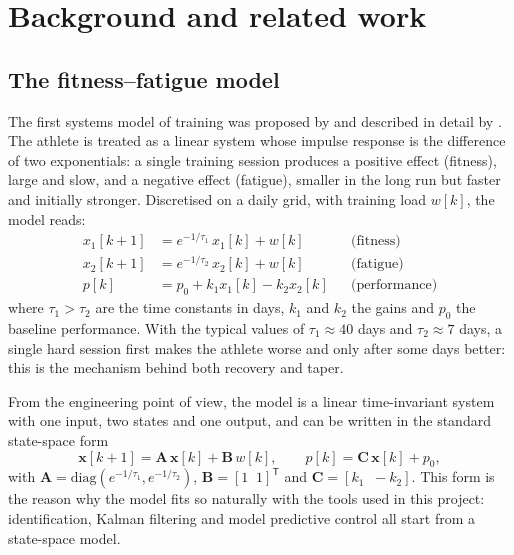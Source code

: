 \documentclass[11pt,a4paper]{article}
\begin{document}
\section{Background and related work}\label{sec:background}

\subsection{The fitness--fatigue model}
The first systems model of training was proposed by \citet{banister1975} and
described in detail by \citet{calvert1976}. The athlete is treated as a linear
system whose impulse response is the difference of two exponentials: a single
training session produces a positive effect (fitness), large and slow, and a
negative effect (fatigue), smaller in the long run but faster and initially
stronger. Discretised on a daily grid, with training load $w[k]$, the model
reads:
\begin{align}
x_1[k+1] &= e^{-1/\tau_1}\, x_1[k] + w[k] && \text{(fitness)}\label{eq:x1}\\
x_2[k+1] &= e^{-1/\tau_2}\, x_2[k] + w[k] && \text{(fatigue)}\label{eq:x2}\\
p[k]     &= p_0 + k_1 x_1[k] - k_2 x_2[k]  && \text{(performance)}\label{eq:p}
\end{align}
where $\tau_1 > \tau_2$ are the time constants in days, $k_1$ and $k_2$ the
gains and $p_0$ the baseline performance. With the typical values of
$\tau_1 \approx 40$ days and $\tau_2 \approx 7$ days, a single hard session
first makes the athlete worse and only after some days better: this is the
mechanism behind both recovery and taper.

From the engineering point of view, the model is a linear time-invariant
system with one input, two states and one output, and can be written in the
standard state-space form
\begin{equation}
\mathbf{x}[k+1] = \mathbf{A}\,\mathbf{x}[k] + \mathbf{B}\,w[k], \qquad
p[k] = \mathbf{C}\,\mathbf{x}[k] + p_0,
\label{eq:ss}
\end{equation}
with $\mathbf{A} = \mathrm{diag}(e^{-1/\tau_1}, e^{-1/\tau_2})$,
$\mathbf{B} = [1\;\;1]^{\mathsf T}$ and $\mathbf{C} = [k_1\;\;-k_2]$.
This form is the reason why the model fits so naturally with the tools used in
this project: identification, Kalman filtering and model predictive control
all start from a state-space model.
\end{document}
